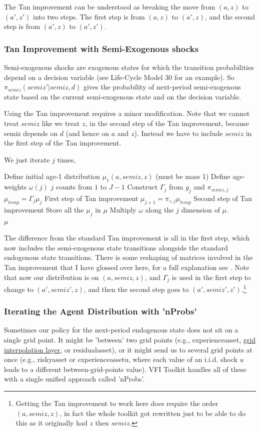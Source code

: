 The Tan improvement can be understood as breaking the move from $(a,z)$ to $(a',z')$ into two steps. The first step is from $(a,z)$ to $(a',z)$, and the second step is from $(a',z)$ to $(a',z')$.

\subsubsection{Tan Improvement with Semi-Exogenous shocks}
Semi-exogenous shocks are exogenous states for which the transition probabilities depend on a decision variable (see Life-Cycle Model 30 for an example). So $\pi_{semiz}(semiz'|semiz,d)$ gives the probability of next-period semi-exogenous state based on the current semi-exogenous state and on the decision variable.

Using the Tan improvement requires a minor modification. Note that we cannot treat $semiz$ like we treat $z$, in the second step of the Tan improvement, because semiz depends on $d$ (and hence on $a$ and $z$). Instead we have to include $semiz$ in the first step of the Tan improvement.

We just iterate $j$ times,
\begin{algorithmic}
 \State Define initial age-1 distribution $\mu_1(a,semiz,z)$ (must be mass 1)
 \State Define age-weights $\omega(j)$
 \For $j$ counts from $1$ to $J-1$
  \State Construct $\Gamma_j$ from $g_j$ and $\pi_{semiz,j}$
  \State $\mu_{temp}=\Gamma_j \mu_j$ \Comment First step of Tan improvement
  \State $\mu_{j+1}=\pi_{z,j} \mu_{temp}$ \Comment Second step of Tan improvement
 \EndFor
 \State Store all the $\mu_j$ in $\mu$
  \State Multiply $\omega$ along the $j$ dimension of $\mu$.
 \\ \Return $\mu$
 \end{algorithmic}
The difference from the standard Tan improvement is all in the first step, which now includes the semi-exogenous state transitions alongside the standard endogenous state transitions.
There is some reshaping of matrices involved in the Tan improvement that I have glossed over here, for a full explanation see \cite{Tan2020}. Note that now our distribution is on $(a,semiz,z)$, and $\Gamma_j$ is used in the first step to change to $(a',semiz',z)$, and then the second step goes to $(a',semiz',z')$.\footnote{Getting the Tan improvement to work here does require the order $(a,semiz,z)$, in fact the whole toolkit got rewritten just to be able to do this as it originally had $z$ then $semiz$.}

\subsubsection{Iterating the Agent Distribution with 'nProbs'}
Sometimes our policy for the next-period endogenous state does not sit on a single grid point. It might be 'between' two grid points (e.g., experienceasset, \href{https://github.com/robertdkirkby/GridInterpolationLayer}{grid interpolation layer}, or residualasset), or it might send us to several grid points at once (e.g., riskyasset or experienceassetu, where each value of an i.i.d. shock $u$ leads to a different between-grid-points value). VFI Toolkit handles all of these with a single unified approach called 'nProbs'.

